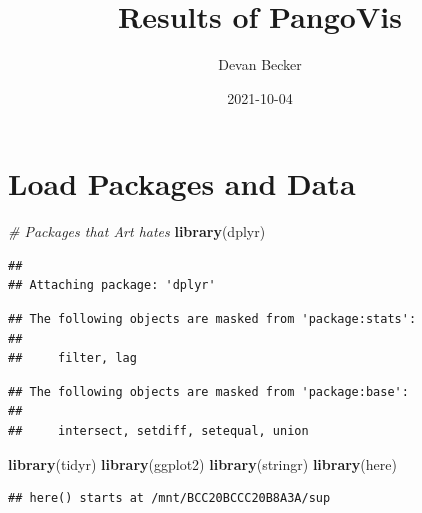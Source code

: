 \documentclass[
]{article}
\title{Results of PangoVis}
\author{Devan Becker}
\date{2021-10-04}
\newenvironment{Shaded}{\begin{snugshade}}{\end{snugshade}}
\newcommand{\CommentTok}[1]{\textcolor[rgb]{0.56,0.35,0.01}{\textit{#1}}}
\newcommand{\KeywordTok}[1]{\textcolor[rgb]{0.13,0.29,0.53}{\textbf{#1}}}
\newcommand{\NormalTok}[1]{#1}
\begin{document}
\maketitle

\hypertarget{load-packages-and-data}{%
\section{Load Packages and Data}\label{load-packages-and-data}}

\begin{Shaded}
\begin{Highlighting}[]
\CommentTok{\# Packages that Art hates}
\KeywordTok{library}\NormalTok{(dplyr)}
\end{Highlighting}
\end{Shaded}

\begin{verbatim}
## 
## Attaching package: 'dplyr'
\end{verbatim}

\begin{verbatim}
## The following objects are masked from 'package:stats':
## 
##     filter, lag
\end{verbatim}

\begin{verbatim}
## The following objects are masked from 'package:base':
## 
##     intersect, setdiff, setequal, union
\end{verbatim}

\begin{Shaded}
\begin{Highlighting}[]
\KeywordTok{library}\NormalTok{(tidyr)}
\KeywordTok{library}\NormalTok{(ggplot2)}
\KeywordTok{library}\NormalTok{(stringr)}
\KeywordTok{library}\NormalTok{(here)}
\end{Highlighting}
\end{Shaded}

\begin{verbatim}
## here() starts at /mnt/BCC20BCCC20B8A3A/sup
\end{verbatim}
\end{document}
